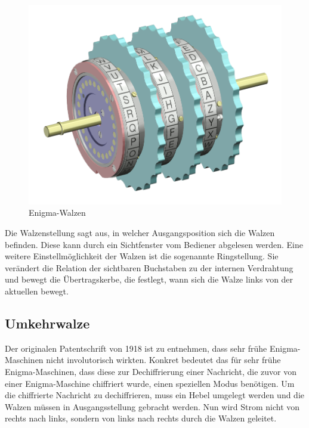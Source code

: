 \begin{figure}[htbp]
	\centering
	\includegraphics[width=.4\linewidth]{Enigma/Enigma-rotor-set}
	\caption{Enigma-Walzen\autocite{enigmarotorset2004}}
	\label{fig:enigma_rotors}
\end{figure}

Die Walzenstellung sagt aus, in welcher Ausgangsposition sich die Walzen befinden.
Diese kann durch ein Sichtfenster vom Bediener abgelesen werden.
Eine weitere Einstellmöglichkeit der Walzen ist die sogenannte Ringstellung.
Sie verändert die Relation der sichtbaren Buchstaben zu der internen Verdrahtung und bewegt die Übertragskerbe, %
die festlegt, wann sich die Walze links von der aktuellen bewegt.


\subsection{Umkehrwalze}\label{subsec:umkehrwalze}
Der originalen Patentschrift\autocite{scherbiuschiffriermaschine1925} von 1918 ist zu entnehmen, dass sehr frühe Enigma-Maschinen nicht involutorisch wirkten.
Konkret bedeutet das für sehr frühe Enigma-Maschinen, dass diese zur Dechiffrierung einer Nachricht, die zuvor von einer Enigma-Maschine chiffriert wurde, einen speziellen Modus benötigen.
Um die chiffrierte Nachricht zu dechiffrieren, muss ein Hebel umgelegt werden und die Walzen müssen in Ausgangsstellung gebracht werden.
Nun wird Strom nicht von rechts nach links, sondern von links nach rechts durch die Walzen geleitet.

